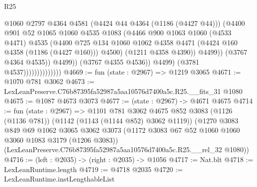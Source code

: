 \begin{lexlean}{R25}
\begin{coremodule}
                                          @1060
                                          @2797
                                          @4364
                                          @4581
                                          (@4424 @44 @4364 (@1186 (@4427 @44)))
                                          (@4400
                                            @901
                                            @52
                                            @1065
                                            @1060
                                            @4535
                                            @1083
                                            (@4466
                                              @900
                                              @1063
                                              @1060
                                              (@4533 @4471)
                                              @4535
                                              (@4400
                                                @725
                                                @134
                                                @1060
                                                @1062
                                                @4358
                                                @4471
                                                (@4424 @160 @4358 (@1186 (@4427 @160)))
                                                @4500)
                                              (@1211 @4358 @4390))
                                            @4499))
                                        (@3767 @4364 @4535))
                                      @4499))
                                  (@3767 @4355 @4536))
                                @4499)
                              (@3781 @4537))))))))))))))
@4669 := fun (state : @2967) => @1219 @3065
@4671 := @1070 @781 @3062
@4673 := LexLeanPreserve.C76b87395fa52987a5aa10576d7400a5c.R25.__fits_31 @1080
@4675 := @1087 @4673 @3073
@4677 := (state : @2967) -> @4671 @4675
@4714 := fun (state : @2967) =>
  @1101
    @781
    @3062
    @4675
    @852
    @3083
    (@1126 (@1136 @781))
    (@1142 (@1143 (@1144 @852) @3062 @1119))
    (@1270
      @3083
      @849
      @69
      @1062
      @3065
      @3062
      @3073
      (@1172 @3083 @67 @52 @1060 @1060 @3060 @1083 @3179 (@1206 @3083))
      (LexLeanPreserve.C76b87395fa52987a5aa10576d7400a5c.R25.__rel_32 @1080))
@4716 := (left : @2035) -> (right : @2035) -> @1056
@4717 := Nat.blt
@4718 := LexLeanRuntime.length
@4719 := @4718 @2035
@4720 := LexLeanRuntime.instLengthableList

\end{coremodule}
\end{lexlean}

